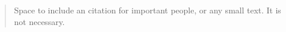%
%

\chapter*{}
\null
\vfill
\begin{quote}
Space to include an citation for important people, or any small text. It is not necessary.
\end{quote}